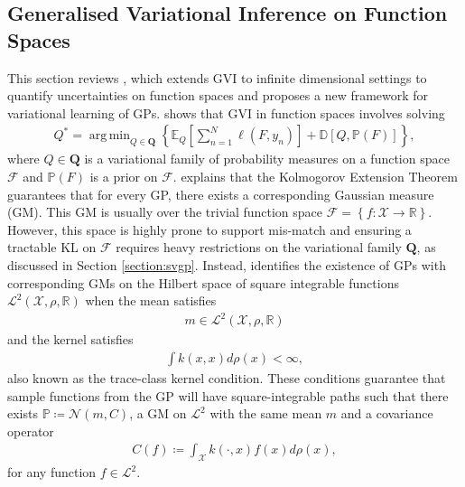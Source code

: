 \documentclass{article}
\DeclareMathOperator*{\argmin}{arg\,min}
\numberwithin{equation}{section}
\begin{document}
\subsection{Generalised Variational Inference on Function Spaces}
This section reviews \cite{wild2022generalized}, which extends GVI to infinite dimensional settings to quantify uncertainties on function spaces and proposes  a new framework for variational learning of GPs.
\cite{wild2022generalized} shows that GVI in function spaces involves solving
\begin{align}
    Q^* = \argmin_{Q \in \boldsymbol{Q}} \left\{\mathbb{E}_{Q}\left[\sum_{n=1}^{N}\ell(F, y_n)\right] + \mathbb{D}\left[Q, \mathbb{P}(F)\right]\right\},
    \label{gvi-posterior-in-fs}
\end{align}
where $Q \in \boldsymbol{Q}$ is a variational family of probability measures on a function space $\boldsymbol{\mathcal{F}}$ and $\mathbb{P}(F)$ is a prior on $\boldsymbol{\mathcal{F}}$.
\cite{wild2022generalized} explains that the Kolmogorov Extension Theorem guarantees that for every GP, there exists a corresponding Gaussian measure (GM). 
This GM is usually over the trivial function space $\boldsymbol{\mathcal{F}} = \left\{f: \mathcal{X} \rightarrow \mathbb{R}\right\}$.
However, this space is highly prone to support mis-match and ensuring a tractable KL on $\boldsymbol{\mathcal{F}}$ requires heavy restrictions on the variational family $\boldsymbol{Q}$, as discussed in Section \ref{section:svgp}.
Instead, \cite{wild2022generalized} identifies the existence of GPs with corresponding GMs on the Hilbert space of square integrable functions $\mathcal{L}^2\left(\mathcal{X}, \rho, \mathbb{R}\right)$ when the mean satisfies
\begin{align}
    m \in \mathcal{L}^2\left(\mathcal{X}, \rho, \mathbb{R}\right)
    \label{l2-mean}
\end{align}
and the kernel satisfies
\begin{align}
    \int k(x, x) d\rho(x) < \infty,
    \label{l2-kernel}
\end{align}
also known as the trace-class kernel condition.
These conditions guarantee that sample functions from the GP will have square-integrable paths such that there exists $\mathbb{P} \coloneqq \mathcal{N}(m, C)$, a GM on $\mathcal{L}^2$ with the same mean $m$ and a covariance operator
\begin{align}
    C(f) \coloneqq \int_{\mathcal{X}} k(\cdot, x) f(x) d\rho(x),
\end{align}
for any function $f \in \mathcal{L}^2$.
\end{document}

